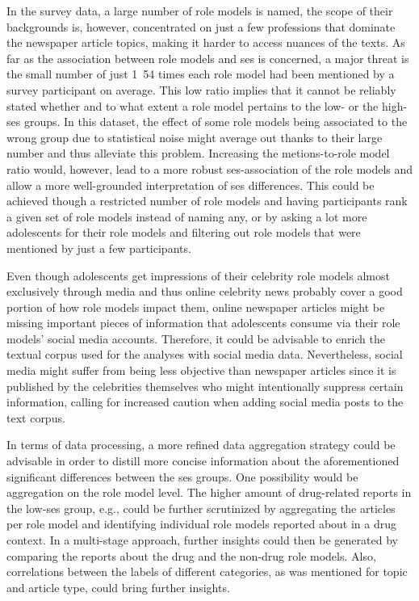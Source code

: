 In the survey data, a large number of role models is named, the scope of their backgrounds is, however, concentrated on just a few professions that dominate the newspaper article topics, making it harder to access nuances of the texts. As far as the association between role models and \gls{ses} is concerned, a major threat is the small number of just \si[]{1.54} times each role model had been mentioned by a survey participant on average. This low ratio implies that it cannot be reliably stated whether and to what extent a role model pertains to the low- or the high-\gls{ses} groups. In this dataset, the effect of some role models being associated to the wrong group due to statistical noise might average out thanks to their large number and thus alleviate this problem. Increasing the metions-to-role model ratio would, however, lead to a  more robust \gls{ses}-association of the role models and allow a more well-grounded interpretation of \gls{ses} differences. This could be achieved though a restricted number of role models and having participants rank a given set of role models instead of naming any, or by asking a lot more adolescents for their role models and filtering out role models that were mentioned by just a few participants.

Even though adolescents get impressions of their celebrity role models almost exclusively through media and thus online celebrity news probably cover a good portion of how role models impact them, online newspaper articles might be missing important pieces of information that adolescents consume via their role models' social media accounts. Therefore, it could be advisable to enrich the textual corpus used for the analyses with social media data. Nevertheless, social media might suffer from being less objective than newspaper articles since it is published by the celebrities themselves who might intentionally suppress certain information, calling for increased caution when adding social media posts to the text corpus.

In terms of data processing, a more refined data aggregation strategy could be advisable in order to distill more concise information about the aforementioned significant differences between the \gls{ses} groups. One possibility would be aggregation on the role model level. The higher amount of drug-related reports in the low-\gls{ses} group, e.g., could be further scrutinized by aggregating the articles per role model and identifying individual role models reported about in a drug context. In a multi-stage approach, further insights could then be generated by comparing the reports about the drug and the non-drug role models. Also, correlations between the labels of different categories, as was mentioned for topic and article type, could bring further insights.

